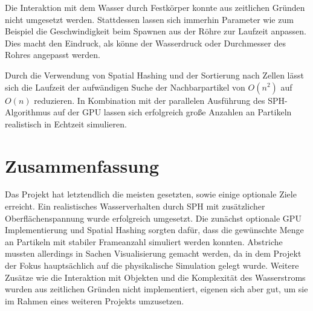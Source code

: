 \documentclass[a4paper]{paper}
\begin{document}
Die Interaktion mit dem Wasser durch Festkörper konnte aus zeitlichen Gründen nicht umgesetzt werden. Stattdessen lassen sich immerhin Parameter wie zum Beispiel die Geschwindigkeit beim Spawnen aus der Röhre zur Laufzeit anpassen. Dies macht den Eindruck, als könne der Wasserdruck oder Durchmesser des Rohres angepasst werden.


Durch die Verwendung von Spatial Hashing und der Sortierung nach Zellen lässt sich die Laufzeit der aufwändigen Suche der Nachbarpartikel von $O(n^2)$ auf $O(n)$ reduzieren.
In Kombination mit der parallelen Ausführung des SPH-Algorithmus auf der GPU lassen sich erfolgreich große Anzahlen an Partikeln realistisch in Echtzeit simulieren.

\section{Zusammenfassung}

Das Projekt hat letztendlich die meisten gesetzten, sowie einige optionale Ziele erreicht. Ein realistisches Wasserverhalten durch SPH mit zusätzlicher Oberflächenspannung wurde erfolgreich umgesetzt. Die zunächst optionale GPU Implementierung und Spatial Hashing sorgten dafür, dass die gewünschte Menge an Partikeln mit stabiler Frameanzahl simuliert werden konnten. Abstriche mussten allerdings in Sachen Visualisierung gemacht werden, da in dem Projekt der Fokus hauptsächlich auf die physikalische Simulation gelegt wurde. Weitere Zusätze wie die Interaktion mit Objekten und die Komplexität des Wasserstroms wurden aus zeitlichen Gründen nicht implementiert, eigenen sich aber gut, um sie im Rahmen eines weiteren Projekts umzusetzen.

\end{document}
